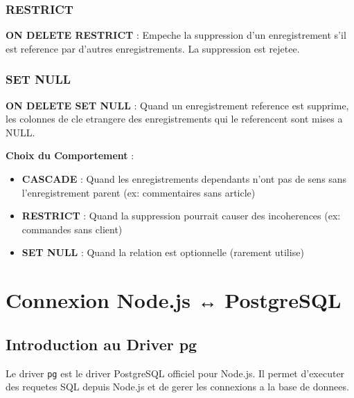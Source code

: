 \documentclass[a4paper,12pt]{book}
\begin{document}
\subsection{RESTRICT}

\begin{definitionbox}
    \textbf{ON DELETE RESTRICT} : Empeche la suppression d'un enregistrement s'il est reference par d'autres enregistrements. La suppression est rejetee.
\end{definitionbox}

\subsection{SET NULL}

\begin{definitionbox}
    \textbf{ON DELETE SET NULL} : Quand un enregistrement reference est supprime, les colonnes de cle etrangere des enregistrements qui le referencent sont mises a NULL.
\end{definitionbox}

\begin{bestpracticebox}
    \textbf{Choix du Comportement} :
    \begin{itemize}
        \item \textbf{CASCADE} : Quand les enregistrements dependants n'ont pas de sens sans l'enregistrement parent (ex: commentaires sans article)
        \item \textbf{RESTRICT} : Quand la suppression pourrait causer des incoherences (ex: commandes sans client)
        \item \textbf{SET NULL} : Quand la relation est optionnelle (rarement utilise)
    \end{itemize}
\end{bestpracticebox}

\chapter{Connexion Node.js ↔ PostgreSQL}

\section{Introduction au Driver pg}

Le driver \texttt{pg} est le driver PostgreSQL officiel pour Node.js. Il permet d'executer des requetes SQL depuis Node.js et de gerer les connexions a la base de donnees.
\end{document}
